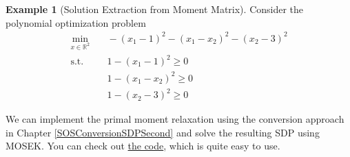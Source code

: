 \documentclass[
]{book}
\theoremstyle{definition}
\theoremstyle{definition}
\newtheorem{example}{Example}[chapter]
\theoremstyle{definition}
\theoremstyle{definition}
\theoremstyle{remark}
\begin{document}
\begin{example}[Solution Extraction from Moment Matrix]
\protect\hypertarget{exm:SolutionExtraction}{}\label{exm:SolutionExtraction}Consider the polynomial optimization problem
\begin{equation}
\begin{split}
\min_{x \in \mathbb{R}^{2}} & \quad -(x_1 - 1)^2 - (x_1 - x_2)^2 - (x_2 - 3)^2 \\
\mathrm{s.t.}& \quad 1 - (x_1 - 1)^2 \geq 0 \\
& \quad 1 - (x_1 - x_2)^2 \geq 0 \\
& \quad 1 - (x_2 - 3)^2 \geq 0
\end{split}
\end{equation}

We can implement the primal moment relaxation using the conversion approach in Chapter \ref{SOSConversionSDPSecond} and solve the resulting SDP using MOSEK. You can check out \href{https://github.com/ComputationalRobotics/Semidefinite-Examples/blob/main/example_moment_sos.m}{the code}, which is quite easy to use.


\end{example}
\end{document}
